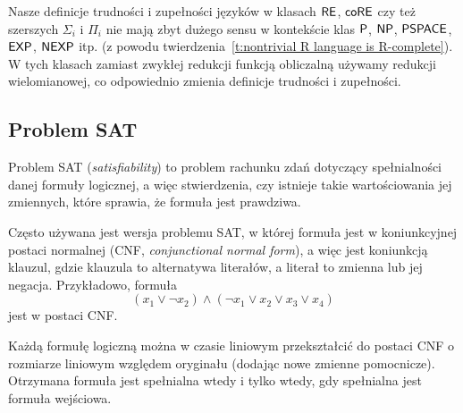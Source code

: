 Nasze definicje trudności i zupełności języków w klasach $\textsf{RE}$, $\textsf{coRE}$ czy też szerszych $\Sigma_i$ i $\Pi_i$ nie mają zbyt dużego sensu w kontekście klas $\textsf{P}$, $\textsf{NP}$, $\textsf{PSPACE}$, $\textsf{EXP}$, $\textsf{NEXP}$ itp. (z powodu twierdzenia~\ref{t:nontrivial R language is R-complete}). W tych klasach zamiast zwykłej redukcji funkcją obliczalną używamy redukcji wielomianowej, co odpowiednio zmienia definicje trudności i zupełności.

\subsection{Problem SAT}

Problem SAT (\textit{satisfiability}) to problem rachunku zdań dotyczący spełnialności danej formuły logicznej, a więc stwierdzenia, czy istnieje takie wartościowania jej zmiennych, które sprawia, że formuła jest prawdziwa.

Często używana jest wersja problemu SAT, w której formuła jest w koniunkcyjnej postaci normalnej (CNF, \textit{conjunctional normal form}), a więc jest koniunkcją klauzul, gdzie klauzula to alternatywa literałów, a literał to zmienna lub jej negacja. Przykładowo, formuła
\[ (x_1 \lor \neg x_2) \land (\neg x_1 \lor x_2 \lor x_3 \lor x_4) \]
jest w postaci CNF.

\begin{fact}\label{f:Tseitin}
    Każdą formułę logiczną można w czasie liniowym przekształcić do postaci CNF o rozmiarze liniowym względem oryginału (dodając nowe zmienne pomocnicze). Otrzymana formuła jest spełnialna wtedy i tylko wtedy, gdy spełnialna jest formuła wejściowa.
\end{fact}

